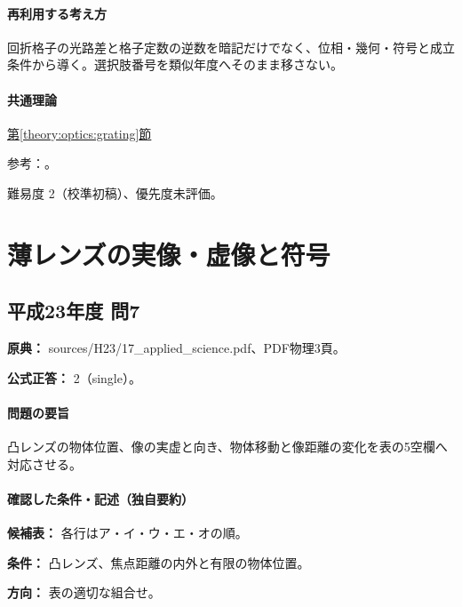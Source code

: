 \paragraph{再利用する考え方} 回折格子の光路差と格子定数の逆数を暗記だけでなく、位相・幾何・符号と成立条件から導く。選択肢番号を類似年度へそのまま移さない。

\paragraph{共通理論} \hyperref[theory:optics:grating]{第\ref*{theory:optics:grating}節}

\par 参考：\cite{os_grating}。

\par 難易度 2（校準初稿）、優先度未評価。

\section{薄レンズの実像・虚像と符号}

\subsection{平成23年度 問7}
\label{q:h23-reg-applied-07}

\noindent\textbf{原典：} sources/H23/17\_applied\_science.pdf、PDF物理3頁。

\textbf{公式正答：} 2（single）。

\paragraph{問題の要旨} 凸レンズの物体位置、像の実虚と向き、物体移動と像距離の変化を表の5空欄へ対応させる。

\paragraph{確認した条件・記述（独自要約）}\mbox{}\par

\noindent\textbf{候補表：} 各行はア・イ・ウ・エ・オの順。\par

\noindent\textbf{条件：} 凸レンズ、焦点距離の内外と有限の物体位置。\par

\noindent\textbf{方向：} 表の適切な組合せ。\par

